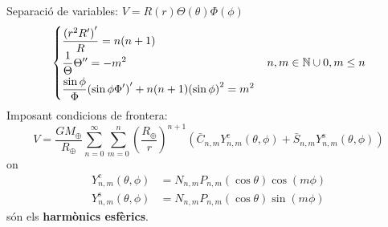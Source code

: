 \documentclass{beamer} %
\begin{document}
\begin{frame}
  Separació de variables: $V=R(r)\Theta(\theta)\Phi(\phi)$
  \begin{gather*}
    \begin{cases}
      \displaystyle\frac{{(r^2R')}'}{R}=n(n+1)                  \\
      \displaystyle\frac{1}{\Theta}\Theta'' =-m^2\vspace{0.1cm} \\
      \displaystyle\frac{\sin\phi}{\Phi}{(\sin\phi\Phi')}'+n(n+1){(\sin\phi)}^2 =m^2
    \end{cases}\!n,m\in\NN\cup{0}, m\leq n
  \end{gather*}\pause
  Imposant condicions de frontera:
  \begin{equation*}
    V =\frac{GM_\oplus}{R_\oplus}\sum_{n=0}^\infty \sum_{m=0}^n{\left(\frac{{R_\oplus}}{r}\right)}^{n+1}(\bar{C}_{n,m}Y_{n,m}^{\mathrm{c}}(\theta,\phi)+\bar{S}_{n,m}Y_{n,m}^{\mathrm{s}}(\theta,\phi))
  \end{equation*}
  on
  \begin{align*}
    Y_{n,m}^{\mathrm{c}}(\theta,\phi) & =N_{n,m}P_{n,m}(\cos\theta)\cos(m\phi) \\
    Y_{n,m}^{\mathrm{s}}(\theta,\phi) & =N_{n,m}P_{n,m}(\cos\theta)\sin(m\phi)
  \end{align*}
  són els \textbf{harmònics esfèrics}.
\end{frame}
\end{document}
